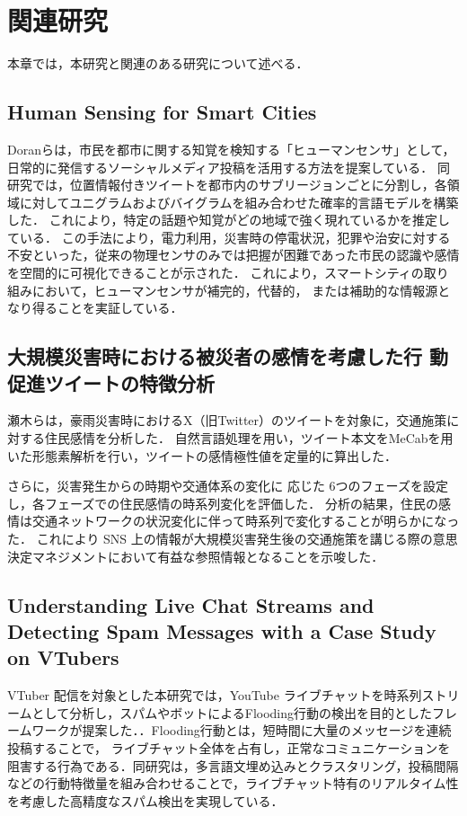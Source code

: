 \chapter{関連研究}
本章では，本研究と関連のある研究について述べる．

\section{Human Sensing for Smart Cities}
Doranら\cite{human_sensing}は，市民を都市に関する知覚を検知する「ヒューマンセンサ」として，日常的に発信するソーシャルメディア投稿を活用する方法を提案している．
同研究では，位置情報付きツイートを都市内のサブリージョンごとに分割し，各領域に対してユニグラムおよびバイグラムを組み合わせた確率的言語モデルを構築した．
これにより，特定の話題や知覚がどの地域で強く現れているかを推定している．
この手法により，電力利用，災害時の停電状況，犯罪や治安に対する不安といった，従来の物理センサのみでは把握が困難であった市民の認識や感情を空間的に可視化できることが示された．
これにより，スマートシティの取り組みにおいて，ヒューマンセンサが補完的，代替的， または補助的な情報源となり得ることを実証している．

\section{大規模災害時における被災者の感情を考慮した行 動促進ツイートの特徴分析 }
瀬木ら\cite{seki2022deim}は，豪雨災害時におけるX（旧Twitter）のツイートを対象に，交通施策に対する住民感情を分析した．
自然言語処理を用い，ツイート本文をMeCabを用いた形態素解析を行い，ツイートの感情極性値を定量的に算出した．

さらに，災害発生からの時期や交通体系の変化に 応じた 6つのフェーズを設定し，各フェーズでの住民感情の時系列変化を評価した．
分析の結果，住民の感情は交通ネットワークの状況変化に伴って時系列で変化することが明らかになった．
これにより SNS 上の情報が大規模災害発生後の交通施策を講じる際の意思決定マネジメントにおいて有益な参照情報となることを示唆した．


\section{Understanding Live Chat Streams and Detecting Spam
Messages with a Case Study on VTubers }
VTuber 配信を対象とした本研究では，YouTube ライブチャットを時系列ストリームとして分析し，スパムやボットによるFlooding行動の検出を目的としたフレームワークが提案した．\cite{li2022live_chat_spam}．Flooding行動とは，短時間に大量のメッセージを連続投稿することで，
ライブチャット全体を占有し，正常なコミュニケーションを阻害する行為である．同研究は，多言語文埋め込みとクラスタリング，投稿間隔などの行動特徴量を組み合わせることで，ライブチャット特有のリアルタイム性を考慮した高精度なスパム検出を実現している．


